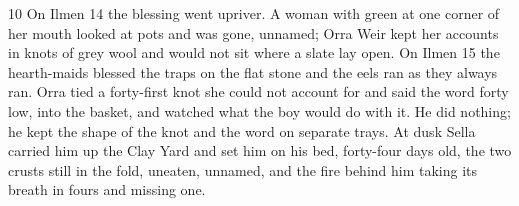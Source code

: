 \begin{CRchronicle}{10}
On Ilmen 14 the blessing went upriver. A woman with green at one corner of her mouth looked at pots and was gone, unnamed; Orra Weir kept her accounts in knots of grey wool and would not sit where a slate lay open. On Ilmen 15 the hearth-maids blessed the traps on the flat stone and the eels ran as they always ran. Orra tied a forty-first knot she could not account for and said the word forty low, into the basket, and watched what the boy would do with it. He did nothing; he kept the shape of the knot and the word on separate trays. At dusk Sella carried him up the Clay Yard and set him on his bed, forty-four days old, the two crusts still in the fold, uneaten, unnamed, and the fire behind him taking its breath in fours and missing one.
\end{CRchronicle}

